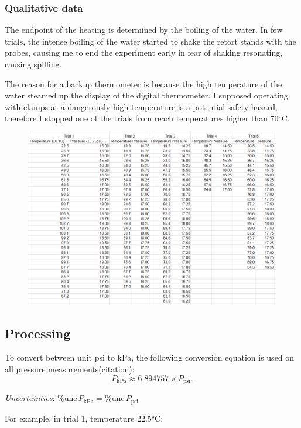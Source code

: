 \documentclass[a4paper,12pt]{article}
\newcommand{\relun}{\% \text{unc}\,}
\begin{document}
\subsubsection*{Qualitative data}
The endpoint of the heating is determined by the boiling of the water. In few trials, the intense boiling of the water started to shake the retort stands with the probes, causing me to end the experiment early in fear of shaking resonating, causing spilling.

The reason for a backup thermometer is because the high temperature of the water steamed up the display of the digital thermometer. I supposed operating with clamps at a dangerously high temperature is a potential safety hazard, therefore I stopped one of the trials from reach temperatures higher than 70$\si{\celsius}$.

\begin{figure}[H]
    \centering
    \includegraphics[width=\textwidth]{assets/rawdata.png}
\end{figure}

\subsection{Processing}
To convert between unit psi to kPa, the following conversion equation is used on all pressure measurements(citation):
\[
    P_{\text{kPa}} \approx 6.894757 \times P_{\text{psi}}.
\]

\textit{Uncertainties}: $\relun P_{\text{kPa}} = \relun P_{\text{psi}}$

For example, in trial 1, temperature 22.5$\si{\celsius}$:
\end{document}
